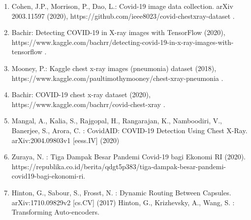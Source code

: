 \documentclass{article}
\begin{document}
   \begin{enumerate}
    \item Cohen, J.P., Morrison, P., Dao, L.: Covid-19 image data collection. arXiv 2003.11597 (2020), https://github.com/ieee8023/covid-chestxray-dataset .
    \item Bachir: Detecting COVID-19 in X-ray images with TensorFlow (2020), https://www.kaggle.com/bachrr/detecting-covid-19-in-x-ray-images-with-tensorflow .
    \item Mooney, P.: Kaggle chest x-ray images (pneumonia) dataset (2018), https://www.kaggle.com/paultimothymooney/chest-xray-pneumonia .
    \item Bachir: COVID-19 chest x-ray dataset (2020), https://www.kaggle.com/bachrr/covid-chest-xray .
    \item Mangal, A., Kalia, S., Rajgopal, H., Rangarajan, K., Namboodiri, V., Banerjee, S., Arora, C. : CovidAID: COVID-19 Detection Using Chest X-Ray. arXiv:2004.09803v1 [eess.IV] (2020)
    \item Zuraya, N. : Tiga Dampak Besar Pandemi Covid-19 bagi Ekonomi RI (2020). https://republika.co.id/berita/qdgt5p383/tiga-dampak-besar-pandemi-covid19-bagi-ekonomi-ri.
    \item Hinton, G., Sabour, S., Frosst, N. : Dynamic Routing Between Capsules. arXiv:1710.09829v2 [cs.CV] (2017)
   Hinton, G., Krizhevsky, A., Wang, S. : Transforming Auto-encoders. 
   \end{enumerate}
   
\end{document}
